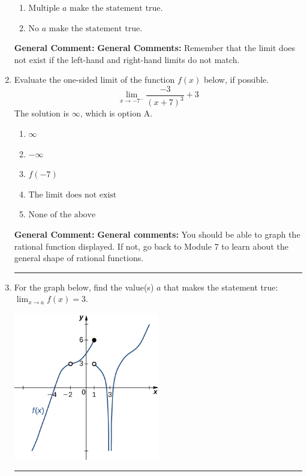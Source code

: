 \documentclass{extbook}[14pt]
\newcommand{\litem}[1]{\item #1

\rule{\textwidth}{0.4pt}}
\begin{document}
\begin{enumerate}
{\begin{enumerate}[label=\Alph*.]
\item \( \text{Multiple } a \text{ make the statement true}. \)


\item \( \text{No } a \text{ make the statement true}. \)


\end{enumerate}

\textbf{General Comment:} \textbf{General Comments:} Remember that the limit does not exist if the left-hand and right-hand limits do not match.
}
\litem{
Evaluate the one-sided limit of the function $f(x)$ below, if possible.
\[ \lim_{x \rightarrow -7^-} \frac{-3}{(x+7)^3}+3 \]The solution is \( \infty \), which is option A.\begin{enumerate}[label=\Alph*.]
\item \( \infty \)


\item \( -\infty \)


\item \( f(-7) \)


\item \( \text{The limit does not exist} \)


\item \( \text{None of the above} \)


\end{enumerate}

\textbf{General Comment:} \textbf{General comments:} You should be able to graph the rational function displayed. If not, go back to Module 7 to learn about the general shape of rational functions.
}
\litem{
For the graph below, find the value(s) $a$ that makes the statement true: $ \displaystyle \lim_{x \rightarrow a} f(x) = 3$.

\begin{center}
    \includegraphics[width=0.5\textwidth]{../Figures/evaluateLimitGraphicallyCopyB.png}
\end{center}


}
\end{enumerate}
\end{document}
